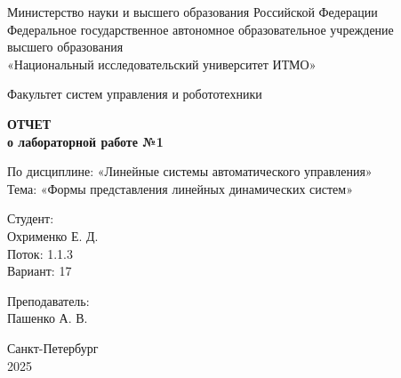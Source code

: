 \documentclass[a4paper,12pt]{article}
\begin{document}
	
	\begin{titlepage}
		\centering
		\vspace*{1cm}
		
		{\small
			Министерство науки и высшего образования Российской Федерации\\
			Федеральное государственное автономное образовательное учреждение\\
			высшего образования\\
			«Национальный исследовательский университет ИТМО»\\
		}
		
		\vspace{2cm}
		
		{\large
			Факультет систем управления и робототехники\\
		}
		
		\vspace{3cm}
		
		{\Huge\bfseries
			ОТЧЕТ\\
		}
		\vspace{0.5cm}
		{\LARGE\bfseries
			о лабораторной работе №1\\
		}
		
		\vspace{1cm}
		
		{\Large
			По дисциплине: «Линейные системы автоматического управления»\\
			\vspace{0.5cm}
			Тема: «Формы представления линейных динамических систем»\\
		}
		
		\vspace{3cm}
		
		\begin{minipage}{0.4\textwidth}
			\raggedright
			{\large
				Студент:\\
			}
			Охрименко Е. Д.\\
			Поток: 1.1.3\\
			Вариант: 17\\
		\end{minipage}
		\hfill
		\begin{minipage}{0.4\textwidth}
			\raggedleft
			{\large
				Преподаватель:\\
			}
			Пашенко А. В.\\
		\end{minipage}
		
		\vfill
		
		{\large
			Санкт-Петербург\\
			2025\\
		}
		
	\end{titlepage}
	
\end{document}
